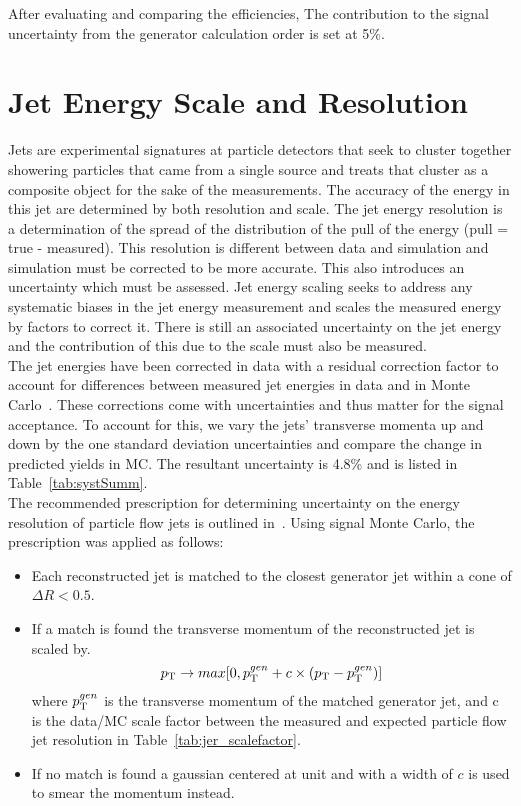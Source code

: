After evaluating and comparing the efficiencies, The contribution to the signal uncertainty from the generator calculation order is set at 5\%.

\section{Jet Energy Scale and Resolution}
Jets are experimental signatures at particle detectors that seek to cluster together showering particles that came from a single source and treats that cluster as a composite object for the sake of the measurements. The accuracy of the energy in this jet are determined by both resolution and scale. The jet energy resolution is a determination of the spread of the distribution of the pull of the energy (pull = true - measured). This resolution is different between data and simulation and simulation must be corrected to be more accurate. This also introduces an uncertainty which must be assessed. Jet energy scaling seeks to address any systematic biases in the jet energy measurement and scales the measured energy by factors to correct it. There is still an associated uncertainty on the jet energy and the contribution of this due to the scale must also be measured.\\

The jet energies have been corrected in data with a residual correction factor to account for differences between measured jet energies in data and in Monte Carlo~\cite{jes_ref}. These corrections come with uncertainties and thus matter for the signal acceptance. To account for this, we vary the jets' transverse momenta up and down by the one standard deviation uncertainties and compare the change in predicted yields in MC. The resultant uncertainty is 4.8\% and is listed in Table~\ref{tab:systSumm}.\\

The recommended prescription for determining uncertainty on the energy resolution of particle flow jets is outlined in~\cite{jer_ref}. Using signal Monte Carlo, the prescription was applied as follows:
\begin{itemize}
\item Each reconstructed jet is matched to the closest generator jet within a cone of $\Delta R < 0.5$.
\item If a match is found the transverse momentum of the reconstructed jet is scaled by.
\begin{equation}
p_{\mathrm{T}} \rightarrow max[0, p_{\mathrm{T}} ^{gen} + c \times (p_{\mathrm{T}} - p_{\mathrm{T}} ^{gen})]
\end{equation}
where $p_{\mathrm{T}} ^{gen}$ is the transverse momentum of the matched generator jet, and c is the data/MC scale factor between the measured and expected particle flow jet resolution in Table~\ref{tab:jer_scalefactor}.
\item If no match is found a gaussian centered at unit and with a width of $c$ is used to smear the momentum instead.
\end{itemize}

